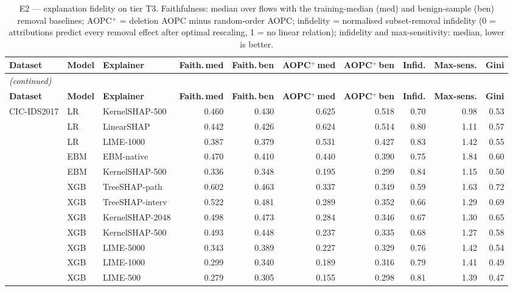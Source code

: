 \begingroup
\scriptsize
\setlength{\tabcolsep}{2.5pt}
\begin{longtable}{lllrrrrrrr}
\caption{E2 --- explanation fidelity on tier T3. Faithfulness: median over flows with the training-median (med) and benign-sample (ben) removal baselines; AOPC$^+$ = deletion AOPC minus random-order AOPC; infidelity = normalised subset-removal infidelity (0 = attributions predict every removal effect after optimal rescaling, 1 = no linear relation); infidelity and max-sensitivity: median, lower is better.}\label{tab:fidelityfull} \\
\toprule
\textbf{Dataset} & \textbf{Model} & \textbf{Explainer} & \textbf{Faith.\,med} & \textbf{Faith.\,ben} & \textbf{AOPC$^+$\,med} & \textbf{AOPC$^+$\,ben} & \textbf{Infid.} & \textbf{Max-sens.} & \textbf{Gini} \\
\midrule
\endfirsthead
\multicolumn{10}{l}{\textit{(continued)}} \\
\toprule
\textbf{Dataset} & \textbf{Model} & \textbf{Explainer} & \textbf{Faith.\,med} & \textbf{Faith.\,ben} & \textbf{AOPC$^+$\,med} & \textbf{AOPC$^+$\,ben} & \textbf{Infid.} & \textbf{Max-sens.} & \textbf{Gini} \\
\midrule
\endhead
\bottomrule
\endlastfoot
CIC-IDS2017 & LR & KernelSHAP-500 & 0.460 & 0.430 & 0.625 & 0.518 & 0.70 & 0.98 & 0.53 \\
 & LR & LinearSHAP & 0.442 & 0.426 & 0.624 & 0.514 & 0.80 & 1.11 & 0.57 \\
 & LR & LIME-1000 & 0.387 & 0.379 & 0.531 & 0.427 & 0.83 & 1.42 & 0.55 \\
 & EBM & EBM-native & 0.470 & 0.410 & 0.440 & 0.390 & 0.75 & 1.84 & 0.60 \\
 & EBM & KernelSHAP-500 & 0.336 & 0.348 & 0.195 & 0.299 & 0.84 & 1.15 & 0.50 \\
 & XGB & TreeSHAP-path & 0.602 & 0.463 & 0.337 & 0.349 & 0.59 & 1.63 & 0.72 \\
 & XGB & TreeSHAP-interv & 0.522 & 0.481 & 0.289 & 0.352 & 0.66 & 1.29 & 0.69 \\
 & XGB & KernelSHAP-2048 & 0.498 & 0.473 & 0.284 & 0.346 & 0.67 & 1.30 & 0.65 \\
 & XGB & KernelSHAP-500 & 0.493 & 0.448 & 0.237 & 0.335 & 0.68 & 1.27 & 0.58 \\
 & XGB & LIME-5000 & 0.343 & 0.389 & 0.227 & 0.329 & 0.76 & 1.42 & 0.54 \\
 & XGB & LIME-1000 & 0.299 & 0.340 & 0.189 & 0.316 & 0.79 & 1.41 & 0.49 \\
 & XGB & LIME-500 & 0.279 & 0.305 & 0.155 & 0.298 & 0.81 & 1.39 & 0.47 \\

\end{longtable}
